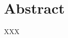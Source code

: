 











\chapter*{Abstract}

XXX

\clearpage



\tableofcontents










\printbibliography

  

